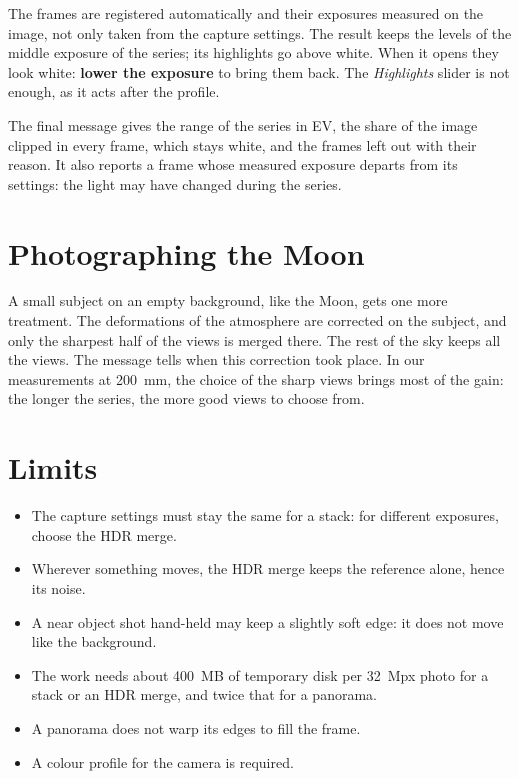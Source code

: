 The frames are registered automatically and their exposures measured on the image, not only
taken from the capture settings. The result keeps the levels of the middle exposure of the
series; its highlights go above white. When it opens they look white: \textbf{lower the
exposure} to bring them back. The \emph{Highlights} slider is not enough, as it acts after the
profile.

The final message gives the range of the series in EV, the share of the image clipped in every
frame, which stays white, and the frames left out with their reason. It also reports a frame
whose measured exposure departs from its settings: the light may have changed during the
series.

\section{Photographing the Moon}
A small subject on an empty background, like the Moon, gets one more treatment. The
deformations of the atmosphere are corrected on the subject, and only the sharpest half
of the views is merged there. The rest of the sky keeps all the views. The message tells
when this correction took place. In our measurements at 200~mm, the choice of the sharp
views brings most of the gain: the longer the series, the more good views to choose from.

\section{Limits}
\begin{itemize}
\item The capture settings must stay the same for a stack: for different exposures, choose
the HDR merge.
\item Wherever something moves, the HDR merge keeps the reference alone, hence its noise.
\item A near object shot hand-held may keep a slightly soft edge: it does not move like
the background.
\item The work needs about 400~MB of temporary disk per 32~Mpx photo for a stack or an HDR
merge, and twice that for a panorama.
\item A panorama does not warp its edges to fill the frame.
\item A colour profile for the camera is required.
\end{itemize}
